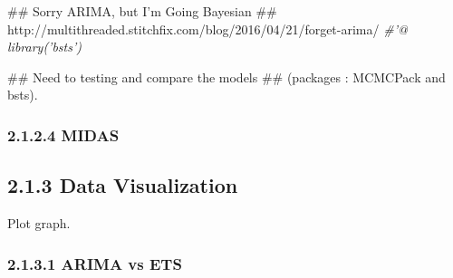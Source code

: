 \documentclass[]{tufte-book}
\newenvironment{Shaded}{}{}
\newcommand{\CommentTok}[1]{\textcolor[rgb]{0.38,0.63,0.69}{\textit{#1}}}
\newcommand{\NormalTok}[1]{#1}
\begin{document}
\begin{Shaded}
\begin{Highlighting}[]
\NormalTok{## Sorry ARIMA, but I’m Going Bayesian}
\NormalTok{## http://multithreaded.stitchfix.com/blog/2016/04/21/forget-arima/}
\CommentTok{#'@ library('bsts')}

\NormalTok{## Need to testing and compare the models}
\NormalTok{## (packages : MCMCPack and bsts).}
\end{Highlighting}
\end{Shaded}

\subsubsection{2.1.2.4 MIDAS}\label{midas}

\subsection{2.1.3 Data Visualization}\label{data-visualization}

Plot graph.

\subsubsection{2.1.3.1 ARIMA vs ETS}\label{arima-vs-ets-1}
\end{document}
